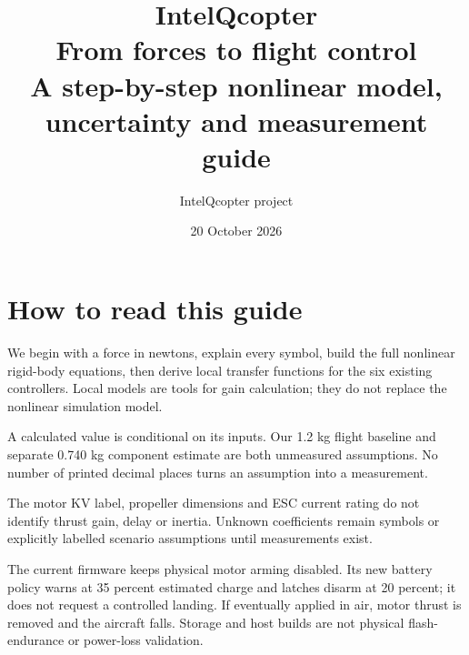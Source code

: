 \documentclass[11pt,a4paper]{report}
\title{\Huge\textcolor{ink}{IntelQcopter}\\[8mm]
\LARGE From forces to flight control\\[5mm]
\large A step-by-step nonlinear model, uncertainty and measurement guide}
\author{IntelQcopter project}
\date{20 October 2026}
\newcommand{\important}[1]{\par\colorbox{soft}{\parbox{\dimexpr\linewidth-2\fboxsep}{#1}}\par}
\begin{document}
\hypersetup{pageanchor=false}
\maketitle
\hypersetup{pageanchor=true}
\chapter*{How to read this guide}
We begin with a force in newtons, explain every symbol, build the full nonlinear
rigid-body equations, then derive local transfer functions for the six existing
controllers. Local models are tools for gain calculation; they do not replace
the nonlinear simulation model.

\important{A calculated value is conditional on its inputs. Our 1.2 kg flight
baseline and separate 0.740 kg component estimate are both unmeasured assumptions.
No number of printed decimal places turns an assumption into a measurement.}

The motor KV label, propeller dimensions and ESC current rating do not identify
thrust gain, delay or inertia. Unknown coefficients remain symbols or explicitly
labelled scenario assumptions until measurements exist.

The current firmware keeps physical motor arming disabled. Its new battery
policy warns at 35 percent estimated charge and latches disarm at 20 percent;
it does not request a controlled landing. If eventually applied in air, motor
thrust is removed and the aircraft falls. Storage and host builds are not
physical flash-endurance or power-loss validation.

\tableofcontents
\clearpage{}





\end{document}
